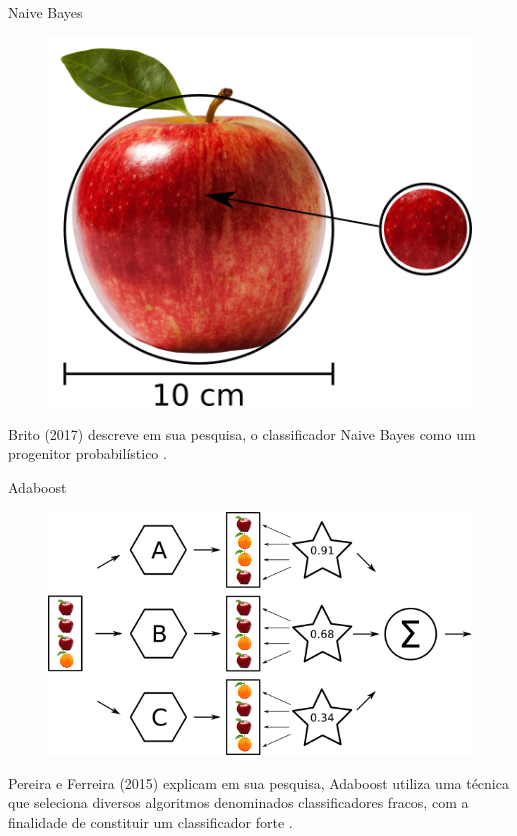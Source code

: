   \begin{frame}[fragile]{Naive Bayes}
    \begin{figure}[H]
        \begin{center}
            \includegraphics[scale=0.50]{images/naive_bayes.png}
        \end{center}
    \end{figure}
    Brito (2017) descreve em sua pesquisa, o classificador Naive Bayes como 
    um progenitor probabilístico \cite{de2017mineraccao}.
  \end{frame}

  \begin{frame}[fragile]{Adaboost}
    \begin{figure}[H]
        \begin{center}
            \includegraphics[scale=0.50]{images/adaboost.png}
        \end{center}
    \end{figure}

    Pereira e Ferreira (2015) explicam em sua pesquisa, Adaboost utiliza uma 
    técnica que seleciona diversos algoritmos denominados classificadores 
    fracos, com a finalidade de constituir um classificador forte 
    \cite{pereiraface}.
  \end{frame}

